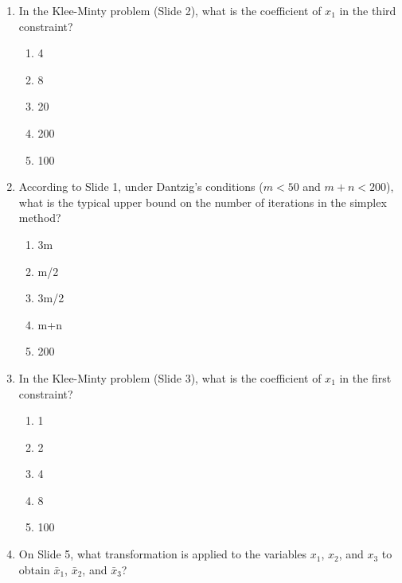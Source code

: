 \documentclass{article}%
\begin{document}
\begin{enumerate}
\begin{enumerate}
\begin{enumerate}
\item The constraints force the simplex method to explore a large number of vertices of the feasible region before reaching the optimal solution, leading to exponential time complexity in the worst case.%
\item The constraints are designed to make the problem easily solvable by the simplex method.%
\item The constraints are randomly generated and therefore have no predictable effect on the simplex method.%
\end{enumerate}%
\vspace{0.5em}%
\end{enumerate}%
\item In the Klee-Minty problem (Slide 2), what is the coefficient of $x_1$ in the third constraint?%
\begin{enumerate}%
\item 4%
\item 8%
\item 20%
\item 200%
\item 100%
\end{enumerate}%
\vspace{1em}%
\item According to Slide 1, under Dantzig's conditions ($m < 50$ and $m + n < 200$), what is the typical upper bound on the number of iterations in the simplex method?%
\begin{enumerate}%
\item 3m%
\item m/2%
\item 3m/2%
\item m+n%
\item 200%
\end{enumerate}%
\vspace{1em}%
\item In the Klee-Minty problem (Slide 3), what is the coefficient of $x_1$ in the first constraint?%
\begin{enumerate}%
\item 1%
\item 2%
\item 4%
\item 8%
\item 100%
\end{enumerate}%
\vspace{1em}%
\item On Slide 5, what transformation is applied to the variables $x_1$, $x_2$, and $x_3$ to obtain $\bar{x}_1$, $\bar{x}_2$, and $\bar{x}_3$?%

\end{enumerate}
\end{document}
